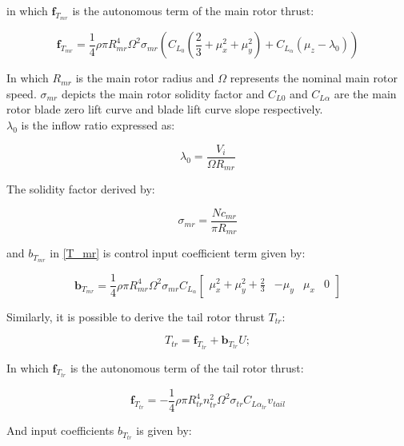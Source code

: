 in which $\textbf{f}_{T_{mr}}$ is the autonomous term of the main rotor thrust:

\begin{equation}\label{f_t}
	\textbf{f}_{T_{mr}}= \frac{1}{4} \rho \pi R_{mr}^4\Omega^2\sigma_{mr}(C_{L_{0}}(\frac{2}{3}+\mu_x^2+\mu_y^2)+C_{L_{\alpha}}(\mu_z-\lambda_0))
\end{equation}

In which $R_{mr}$ is the main rotor radius and $\Omega$ represents the nominal main rotor speed. $\sigma_{mr}$ depicts the main rotor solidity factor and $C_{L0}$ and $C_{L\alpha}$ are the main rotor blade zero lift curve and blade lift curve slope respectively.\\
$\lambda_0$ is the inflow ratio expressed as:

\begin{equation}
	\lambda_0=\frac{V_i}{\Omega R_{mr}}
\end{equation}

The solidity factor derived by:

\begin{equation}
	\sigma_{mr}=\frac{Nc_{mr}}{\pi R_{mr}}
\end{equation}

and $b_{T_{mr}}$ in \ref{T_mr} is control input coefficient term given by:

\begin{equation}\label{b_T}
	\textbf{b}_{T_{mr}}= \frac{1}{4} \rho \pi R_{mr}^4 \Omega^2 \sigma_{mr} C_{L_{\alpha}}\begin{bmatrix}
		\mu_x^2+\mu_y^2+\frac{2}{3}&
		-\mu_y&
		\mu_x&
		0
	\end{bmatrix}
\end{equation}

Similarly, it is possible to derive the tail rotor thrust $T_{tr}$:

\begin{equation}
	T_{tr} = \textbf{f}_{T_{tr}}+\textbf{b}_{T_{tr}}U;
\end{equation}

In which $\textbf{f}_{T_{tr}}$ is the autonomous term of the tail rotor thrust:

\begin{equation}\label{f_t_tr}
	\textbf{f}_{T_{tr}}=- \frac{1}{4} \rho \pi R_{tr}^4 n_{tr}^2\Omega^2\sigma_{tr}C_{L\alpha_{tr}}v_{tail}
\end{equation}

And input coefficients $b_{T_{tr}}$ is given by:

